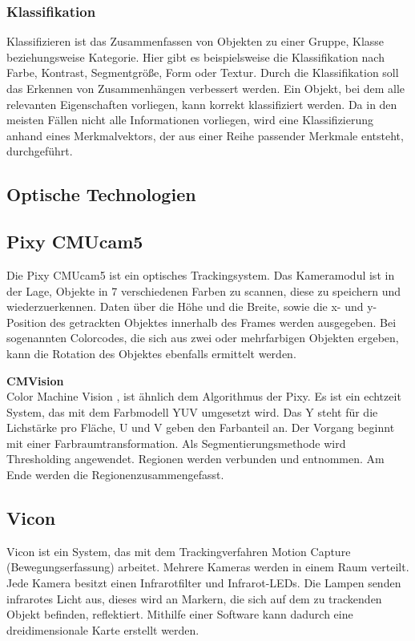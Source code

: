     \subsubsection{Klassifikation}
    Klassifizieren\cite{Bildverarbeitung} ist das Zusammenfassen von Objekten zu einer Gruppe, Klasse beziehungsweise Kategorie. Hier gibt es beispielsweise die Klassifikation nach Farbe, Kontrast, Segmentgröße, Form oder Textur. Durch die Klassifikation soll das Erkennen von Zusammenhängen verbessert werden. Ein Objekt, bei dem alle relevanten Eigenschaften vorliegen, kann korrekt klassifiziert werden. Da in den meisten Fällen nicht alle Informationen vorliegen, wird eine Klassifizierung anhand eines Merkmalvektors, der aus einer Reihe passender Merkmale entsteht, durchgeführt. 

    \subsection{Optische Technologien}
    \subsection*{Pixy CMUcam5}
    Die Pixy CMUcam5\cite{Pixy} ist ein optisches Trackingsystem. Das Kameramodul ist in der Lage, Objekte in 7 verschiedenen Farben zu scannen, diese zu speichern und wiederzuerkennen. Daten über die Höhe und die Breite, sowie die x- und y-Position des getrackten Objektes innerhalb des Frames werden ausgegeben. Bei sogenannten Colorcodes, die sich aus zwei oder mehrfarbigen Objekten ergeben, kann die Rotation des Objektes ebenfalls ermittelt werden.

    \textbf{CMVision}\\
    Color Machine Vision\cite{Pixy_Verfahren} \cite{Pixy_Verfahren2}, ist ähnlich dem Algorithmus der Pixy. Es ist ein echtzeit System, das mit dem Farbmodell YUV umgesetzt wird. Das Y steht für die Lichstärke pro Fläche, U und V geben den Farbanteil an. Der Vorgang beginnt mit einer Farbraumtransformation. Als Segmentierungsmethode wird Thresholding angewendet. Regionen werden verbunden und entnommen. Am Ende werden die Regionenzusammengefasst.  

    \subsection*{Vicon}
    Vicon\cite{Vicon} ist ein System, das mit dem Trackingverfahren Motion Capture (Bewegungserfassung) arbeitet.
    Mehrere Kameras werden in einem Raum verteilt. Jede Kamera besitzt einen Infrarotfilter und Infrarot-LEDs. Die Lampen senden infrarotes Licht aus, dieses wird an Markern, die sich auf dem zu trackenden Objekt befinden, reflektiert. Mithilfe einer Software kann dadurch eine dreidimensionale Karte erstellt werden.
    

